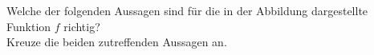 \begin{beispiel}[AN 1.2]{1}
Welche der folgenden Aussagen sind für die in der Abbildung dargestellte Funktion $f$ richtig? \\
Kreuze die beiden zutreffenden Aussagen an.

\end{beispiel}